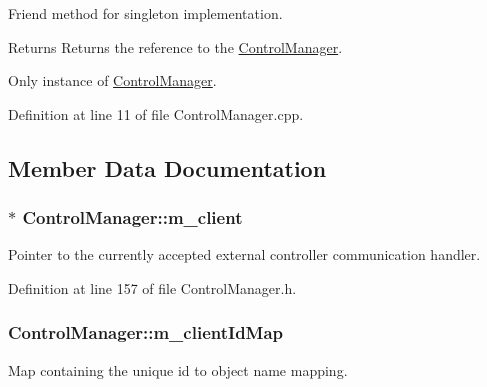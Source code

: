 Friend method for singleton implementation. 

\begin{DoxyReturn}{Returns}
Returns the reference to the \hyperlink{class_control_manager}{Control\-Manager}.

Only instance of \hyperlink{class_control_manager}{Control\-Manager}. 
\end{DoxyReturn}


Definition at line 11 of file Control\-Manager.\-cpp.



\subsection{Member Data Documentation}
\hypertarget{class_control_manager_a3081c331c70f5b08dc0ef2615d86cc55}{
\subsubsection[{m\-\_\-client}]{$\ast$ Control\-Manager\-::m\-\_\-client\hspace{0.3cm}{\ttfamily [private]}}}\label{class_control_manager_a3081c331c70f5b08dc0ef2615d86cc55}


Pointer to the currently accepted external controller communication handler. 



Definition at line 157 of file Control\-Manager.\-h.

\hypertarget{class_control_manager_a5623f6ef4da21d143a7a6cf5fbee136f}{
\subsubsection[{m\-\_\-client\-Id\-Map}]{ Control\-Manager\-::m\-\_\-client\-Id\-Map\hspace{0.3cm}{\ttfamily [private]}}}\label{class_control_manager_a5623f6ef4da21d143a7a6cf5fbee136f}


Map containing the unique id to object name mapping. 



